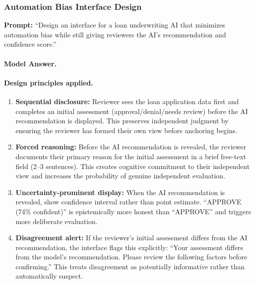 \subsubsection{Automation Bias Interface Design}

\textbf{Prompt:} ``Design an interface for a loan underwriting AI that minimizes automation bias while still giving reviewers the AI's recommendation and confidence score.''

\paragraph{Model Answer.}

\paragraph{Design principles applied.}

\begin{enumerate}
    \item \textbf{Sequential disclosure:} Reviewer sees the loan application data first and completes an initial assessment (approval/denial/needs review) before the AI recommendation is displayed. This preserves independent judgment by ensuring the reviewer has formed their own view before anchoring begins.

    \item \textbf{Forced reasoning:} Before the AI recommendation is revealed, the reviewer documents their primary reason for the initial assessment in a brief free-text field (2--3 sentences). This creates cognitive commitment to their independent view and increases the probability of genuine independent evaluation.

    \item \textbf{Uncertainty-prominent display:} When the AI recommendation is revealed, show confidence interval rather than point estimate. ``APPROVE (74\% confident)'' is epistemically more honest than ``APPROVE'' and triggers more deliberate evaluation.

    \item \textbf{Disagreement alert:} If the reviewer's initial assessment differs from the AI recommendation, the interface flags this explicitly: ``Your assessment differs from the model's recommendation. Please review the following factors before confirming.'' This treats disagreement as potentially informative rather than automatically suspect.
\end{enumerate}

